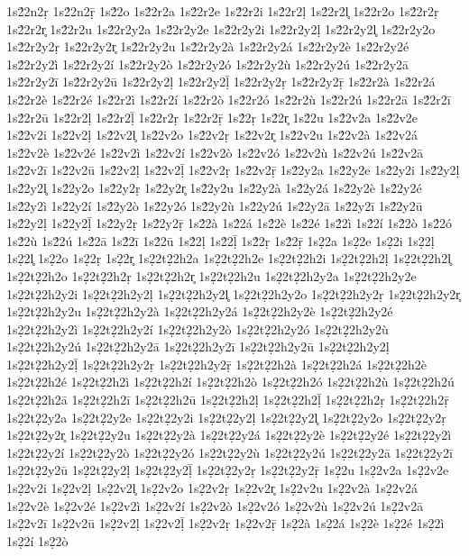 {1s2́2n2ṛ
1s2́2n2ṝ
1s2́2o
1s2́2r2a
1s2́2r2e
1s2́2r2i
1s2́2r2ḷ
1s2́2r2l̥
1s2́2r2o
1s2́2r2ṛ
1s2́2r2r̥
1s2́2r2u
1s2́2r2y2a
1s2́2r2y2e
1s2́2r2y2i
1s2́2r2y2ḷ
1s2́2r2y2l̥
1s2́2r2y2o
1s2́2r2y2ṛ
1s2́2r2y2r̥
1s2́2r2y2u
1s2́2r2y2à
1s2́2r2y2á
1s2́2r2y2è
1s2́2r2y2é
1s2́2r2y2ì
1s2́2r2y2í
1s2́2r2y2ò
1s2́2r2y2ó
1s2́2r2y2ù
1s2́2r2y2ú
1s2́2r2y2ā
1s2́2r2y2ī
1s2́2r2y2ū
1s2́2r2y2ḷ
1s2́2r2y2ḹ
1s2́2r2y2ṛ
1s2́2r2y2ṝ
1s2́2r2à
1s2́2r2á
1s2́2r2è
1s2́2r2é
1s2́2r2ì
1s2́2r2í
1s2́2r2ò
1s2́2r2ó
1s2́2r2ù
1s2́2r2ú
1s2́2r2ā
1s2́2r2ī
1s2́2r2ū
1s2́2r2ḷ
1s2́2r2ḹ
1s2́2r2ṛ
1s2́2r2ṝ
1s2́2ṛ
1s2́2r̥
1s2́2u
1s2́2v2a
1s2́2v2e
1s2́2v2i
1s2́2v2ḷ
1s2́2v2l̥
1s2́2v2o
1s2́2v2ṛ
1s2́2v2r̥
1s2́2v2u
1s2́2v2à
1s2́2v2á
1s2́2v2è
1s2́2v2é
1s2́2v2ì
1s2́2v2í
1s2́2v2ò
1s2́2v2ó
1s2́2v2ù
1s2́2v2ú
1s2́2v2ā
1s2́2v2ī
1s2́2v2ū
1s2́2v2ḷ
1s2́2v2ḹ
1s2́2v2ṛ
1s2́2v2ṝ
1s2́2y2a
1s2́2y2e
1s2́2y2i
1s2́2y2ḷ
1s2́2y2l̥
1s2́2y2o
1s2́2y2ṛ
1s2́2y2r̥
1s2́2y2u
1s2́2y2à
1s2́2y2á
1s2́2y2è
1s2́2y2é
1s2́2y2ì
1s2́2y2í
1s2́2y2ò
1s2́2y2ó
1s2́2y2ù
1s2́2y2ú
1s2́2y2ā
1s2́2y2ī
1s2́2y2ū
1s2́2y2ḷ
1s2́2y2ḹ
1s2́2y2ṛ
1s2́2y2ṝ
1s2́2à
1s2́2á
1s2́2è
1s2́2é
1s2́2ì
1s2́2í
1s2́2ò
1s2́2ó
1s2́2ù
1s2́2ú
1s2́2ā
1s2́2ī
1s2́2ū
1s2́2ḷ
1s2́2ḹ
1s2́2ṛ
1s2́2ṝ
1s2̣2a
1s2̣2e
1s2̣2i
1s2̣2ḷ
1s2̣2l̥
1s2̣2o
1s2̣2ṛ
1s2̣2r̥
1s2̣2t2̣2h2a
1s2̣2t2̣2h2e
1s2̣2t2̣2h2i
1s2̣2t2̣2h2ḷ
1s2̣2t2̣2h2l̥
1s2̣2t2̣2h2o
1s2̣2t2̣2h2ṛ
1s2̣2t2̣2h2r̥
1s2̣2t2̣2h2u
1s2̣2t2̣2h2y2a
1s2̣2t2̣2h2y2e
1s2̣2t2̣2h2y2i
1s2̣2t2̣2h2y2ḷ
1s2̣2t2̣2h2y2l̥
1s2̣2t2̣2h2y2o
1s2̣2t2̣2h2y2ṛ
1s2̣2t2̣2h2y2r̥
1s2̣2t2̣2h2y2u
1s2̣2t2̣2h2y2à
1s2̣2t2̣2h2y2á
1s2̣2t2̣2h2y2è
1s2̣2t2̣2h2y2é
1s2̣2t2̣2h2y2ì
1s2̣2t2̣2h2y2í
1s2̣2t2̣2h2y2ò
1s2̣2t2̣2h2y2ó
1s2̣2t2̣2h2y2ù
1s2̣2t2̣2h2y2ú
1s2̣2t2̣2h2y2ā
1s2̣2t2̣2h2y2ī
1s2̣2t2̣2h2y2ū
1s2̣2t2̣2h2y2ḷ
1s2̣2t2̣2h2y2ḹ
1s2̣2t2̣2h2y2ṛ
1s2̣2t2̣2h2y2ṝ
1s2̣2t2̣2h2à
1s2̣2t2̣2h2á
1s2̣2t2̣2h2è
1s2̣2t2̣2h2é
1s2̣2t2̣2h2ì
1s2̣2t2̣2h2í
1s2̣2t2̣2h2ò
1s2̣2t2̣2h2ó
1s2̣2t2̣2h2ù
1s2̣2t2̣2h2ú
1s2̣2t2̣2h2ā
1s2̣2t2̣2h2ī
1s2̣2t2̣2h2ū
1s2̣2t2̣2h2ḷ
1s2̣2t2̣2h2ḹ
1s2̣2t2̣2h2ṛ
1s2̣2t2̣2h2ṝ
1s2̣2t2̣2y2a
1s2̣2t2̣2y2e
1s2̣2t2̣2y2i
1s2̣2t2̣2y2ḷ
1s2̣2t2̣2y2l̥
1s2̣2t2̣2y2o
1s2̣2t2̣2y2ṛ
1s2̣2t2̣2y2r̥
1s2̣2t2̣2y2u
1s2̣2t2̣2y2à
1s2̣2t2̣2y2á
1s2̣2t2̣2y2è
1s2̣2t2̣2y2é
1s2̣2t2̣2y2ì
1s2̣2t2̣2y2í
1s2̣2t2̣2y2ò
1s2̣2t2̣2y2ó
1s2̣2t2̣2y2ù
1s2̣2t2̣2y2ú
1s2̣2t2̣2y2ā
1s2̣2t2̣2y2ī
1s2̣2t2̣2y2ū
1s2̣2t2̣2y2ḷ
1s2̣2t2̣2y2ḹ
1s2̣2t2̣2y2ṛ
1s2̣2t2̣2y2ṝ
1s2̣2u
1s2̣2v2a
1s2̣2v2e
1s2̣2v2i
1s2̣2v2ḷ
1s2̣2v2l̥
1s2̣2v2o
1s2̣2v2ṛ
1s2̣2v2r̥
1s2̣2v2u
1s2̣2v2à
1s2̣2v2á
1s2̣2v2è
1s2̣2v2é
1s2̣2v2ì
1s2̣2v2í
1s2̣2v2ò
1s2̣2v2ó
1s2̣2v2ù
1s2̣2v2ú
1s2̣2v2ā
1s2̣2v2ī
1s2̣2v2ū
1s2̣2v2ḷ
1s2̣2v2ḹ
1s2̣2v2ṛ
1s2̣2v2ṝ
1s2̣2à
1s2̣2á
1s2̣2è
1s2̣2é
1s2̣2ì
1s2̣2í
1s2̣2ò
}
